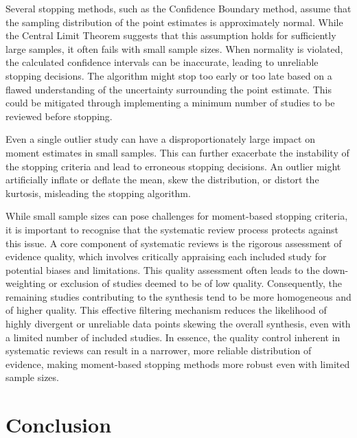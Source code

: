 \documentclass[sigconf,natbib=true,anonymous=true]{acmart}
\begin{document}
Several stopping methods, such as the Confidence Boundary \- method, assume that the sampling distribution of the point estimates is approximately normal. While the Central Limit Theorem suggests that this assumption holds for sufficiently large samples, it often fails with small sample sizes. When normality is violated, the calculated confidence intervals can be inaccurate, leading to unreliable stopping decisions. The algorithm might stop too early or too late based on a flawed understanding of the uncertainty surrounding the point estimate. This could be mitigated through implementing a minimum number of studies to be reviewed before stopping.

Even a single outlier study can have a disproportionately large impact on moment estimates in small samples. This can further exacerbate the instability of the stopping criteria and lead to erroneous stopping decisions. An outlier might artificially inflate or deflate the mean, skew the distribution, or distort the kurtosis, misleading the stopping algorithm. 

While small sample sizes can pose challenges for moment-based stopping criteria, it is important to recognise that the systematic review process protects against this issue. A core component of systematic reviews is the rigorous assessment of evidence quality, which involves critically appraising each included study for potential biases and limitations. This quality assessment often leads to the down-weighting or exclusion of studies deemed to be of low quality. Consequently, the remaining studies contributing to the synthesis tend to be more homogeneous and of higher quality. This effective filtering mechanism reduces the likelihood of highly divergent or unreliable data points skewing the overall synthesis, even with a limited number of included studies. In essence, the quality control inherent in systematic reviews can result in a narrower, more reliable distribution of evidence, making moment-based stopping methods more robust even with limited sample sizes.


\section{Conclusion}
\end{document}
